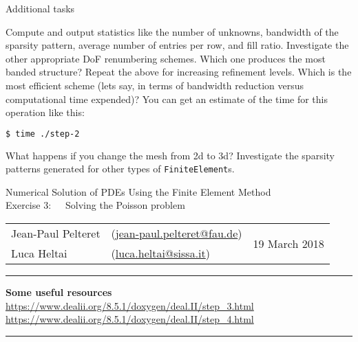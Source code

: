 \documentclass[11pt,answers]{exam}
\makeatletter
\newcommand{\makeheader}[3]{%
\setcounter{question}{0}
\begin{center}
{\sc Numerical Solution of PDEs Using the Finite Element Method}\vspace{2ex}\\
{\sc Exercise #1:\ \ \ #2}\vspace{2ex}\\
\begin{tabular*}{\textwidth}{ll @{\extracolsep{\fill}}r}
Jean-Paul Pelteret & (\url{jean-paul.pelteret@fau.de}) & \multirow{2}{*}{#3} \\
Luca Heltai & (\url{luca.heltai@sissa.it}) & \\
\end{tabular*}
\end{center}
}
\newcommand{\makeresources}[1]{%
\rule{\textwidth}{0.6mm}
\textbf{Some useful resources}\\[1.5ex]
#1 \\
\rule{\textwidth}{0.6mm}
}
\makeatother
\begin{document}
\begin{questions}

\question Additional tasks
\begin{parts}
\bonuspart Compute and output statistics like the number of unknowns, bandwidth of the sparsity pattern, average number of entries per row, and fill ratio.
\bonuspart Investigate the other appropriate DoF renumbering schemes. Which one produces the most banded structure?
\bonuspart Repeat the above for increasing refinement levels. Which is the most efficient scheme (lets say, in terms of bandwidth reduction versus computational time expended)?  You can get an estimate of the time for this operation like this:
\begin{lstlisting}[language=bash]
$ time ./step-2
\end{lstlisting}
\bonuspart What happens if you change the mesh from 2d to 3d?
\bonuspart Investigate the sparsity patterns generated for other types of \verb|FiniteElement|s.
\end{parts}

\end{questions}




\clearpage
\makeheader{3}{Solving the Poisson problem}{19 March 2018}
\makeresources{%
\url{https://www.dealii.org/8.5.1/doxygen/deal.II/step_3.html} \\
\url{https://www.dealii.org/8.5.1/doxygen/deal.II/step_4.html}
}
\end{document}

